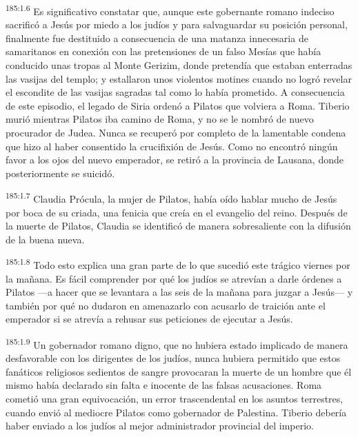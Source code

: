 \par 
\textsuperscript{185:1.6} Es significativo constatar que, aunque este gobernante romano indeciso sacrificó a Jesús por miedo a los judíos y para salvaguardar su posición personal, finalmente fue destituido a consecuencia de una matanza innecesaria de samaritanos en conexión con las pretensiones de un falso Mesías que había conducido unas tropas al Monte Gerizim, donde pretendía que estaban enterradas las vasijas del templo; y estallaron unos violentos motines cuando no logró revelar el escondite de las vasijas sagradas tal como lo había prometido. A consecuencia de este episodio, el legado de Siria ordenó a Pilatos que volviera a Roma. Tiberio murió mientras Pilatos iba camino de Roma, y no se le nombró de nuevo procurador de Judea. Nunca se recuperó por completo de la lamentable condena que hizo al haber consentido la crucifixión de Jesús. Como no encontró ningún favor a los ojos del nuevo emperador, se retiró a la provincia de Lausana, donde posteriormente se suicidó.

\par 
\textsuperscript{185:1.7} Claudia Prócula, la mujer de Pilatos, había oído hablar mucho de Jesús por boca de su criada, una fenicia que creía en el evangelio del reino. Después de la muerte de Pilatos, Claudia se identificó de manera sobresaliente con la difusión de la buena nueva.

\par 
\textsuperscript{185:1.8} Todo esto explica una gran parte de lo que sucedió este trágico viernes por la mañana. Es fácil comprender por qué los judíos se atrevían a darle órdenes a Pilatos ---a hacer que se levantara a las seis de la mañana para juzgar a Jesús--- y también por qué no dudaron en amenazarlo con acusarlo de traición ante el emperador si se atrevía a rehusar sus peticiones de ejecutar a Jesús.

\par 
\textsuperscript{185:1.9} Un gobernador romano digno, que no hubiera estado implicado de manera desfavorable con los dirigentes de los judíos, nunca hubiera permitido que estos fanáticos religiosos sedientos de sangre provocaran la muerte de un hombre que él mismo había declarado sin falta e inocente de las falsas acusaciones. Roma cometió una gran equivocación, un error trascendental en los asuntos terrestres, cuando envió al mediocre Pilatos como gobernador de Palestina. Tiberio debería haber enviado a los judíos al mejor administrador provincial del imperio.

